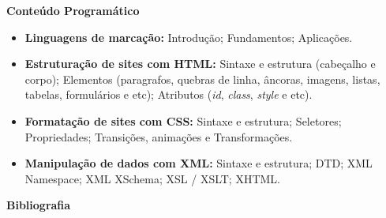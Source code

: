 
\begin{snugshade}\begin{center}\textbf{
    Conteúdo Programático
}\end{center}\end{snugshade}

\begin{itemize}

\item \textbf{Linguagens de marcação:}
    Introdução; Fundamentos; Aplicações.

\item \textbf{Estruturação de sites com HTML:}
    Sintaxe e estrutura (cabeçalho e corpo); Elementos (paragrafos, quebras de linha, âncoras, imagens, listas, tabelas, formulários e etc); Atributos (\textit{id}, \textit{class}, \textit{style} e etc).

\item \textbf{Formatação de sites com CSS:}
    Sintaxe e estrutura; Seletores; Propriedades; Transições, animações e Transformações.

\item \textbf{Manipulação de dados com XML:}
    Sintaxe e estrutura; DTD; XML Namespace; XML XSchema; XSL / XSLT; XHTML.

\end{itemize}







\begin{snugshade}\begin{center}\textbf{
    Bibliografia
}\end{center}\end{snugshade}

